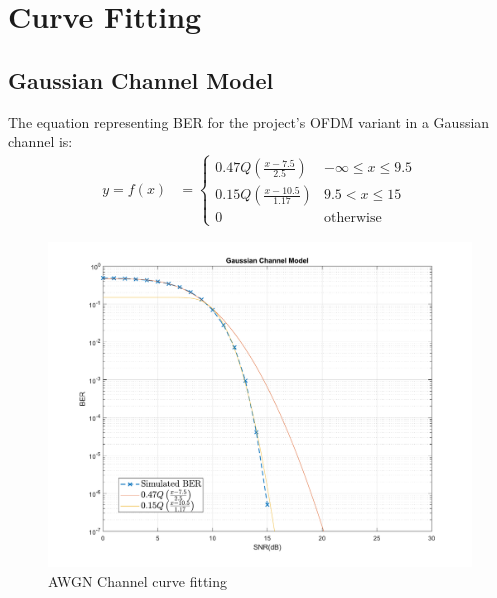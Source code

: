 \section{Curve Fitting}

\subsection{Gaussian Channel Model}
The equation representing BER for the project's OFDM variant in a Gaussian channel is:
\begin{align*}
	y = f(x) &=
	\begin{cases}
		0.47Q \left(\frac{x - 7.5}{2.5}\right) & -\infty \leq x \leq 9.5 \\
		0.15Q \left(\frac{x - 10.5}{1.17}\right) & 9.5 < x \leq 15 \\
		0 & \text{otherwise}
	\end{cases}
\end{align*}
\begin{figure}[htpb!]
    \centering
    \includegraphics[scale=0.6]{Graphics/Methodology/GaussCurveFit.pdf}
    \caption{AWGN Channel curve fitting}
    \label{fig:gaussCurveFit}
\end{figure}
\pagebreak

